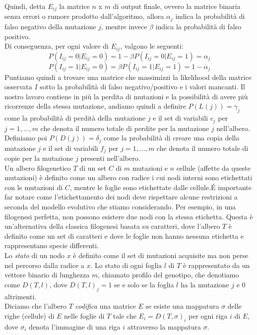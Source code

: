 \documentclass{report}
\begin{document}
  Quindi, detta $E_{ij}$ la matrice $n$ x $m$ di output finale, ovvero la matrice binaria senza errori o rumore prodotto dall'algoritmo, allora ${\alpha}_{j}$ indica la probabilità di falso negativo della mutazione $j$, mentre invece $\beta$ indica la probabilità di falso positivo.\\
  Di conseguenza, per ogni valore di ${E}_{ij}$, valgono le seguenti:
  \[
    P(I_{ij} = 0|{E}_{ij} = 0) = 1 - \beta P(I_{ij} = 0|E_{ij} = 1) = \alpha_{j}
  \]
  \[
    P(I_{ij} = 1|E_{ij} = 0) = \beta P(I_{ij} = 1|E_{ij} = 1) = 1 - \alpha_{j}
  \]
  Puntiamo quindi a trovare una matrice che massimizzi la likelihood della matrice osservata $I$ sotto la probabilità di falso negativo/positivo e i valori mancanti.
  Il nostro lavoro contiene in più la perdita di mutazioni e la possibilità di avere più ricorrenze della stessa mutazione, andiamo quindi a definire $P(L(j))={\gamma}_{j}$ come la probabilità di perdità della mutazione $j$ e il set di variabili ${c}_{j}$ per $j=1,...,m$ che denota il numero totale di perdite per la mutazione $j$ nell'albero.
  Definiamo poi $P(D(j))={\delta}_{j}$ come la probabilità di creare una copia della mutazione $j$ e il set di variabili ${f}_{j}$ per $j=1,...,m$ che denota il numero totale di copie per la mutazione $j$ presenti nell'albero.\\
  Un albero filogenetico $T$ di un set $C$ di $m$ mutazioni e $n$ cellule (affette da queste mutazioni) è definito come un albero con radice i cui nodi interni sono etichettati con le mutazioni di $C$, mentre le foglie sono etichettate dalle cellule.\;\'E importante far notare come l'etichettamento dei nodi deve rispettare alcune restrizioni a seconda del modello evolutivo che stiamo considerando. Per esempio, in una filogenesi perfetta, non possono esistere due nodi con la stessa etichetta.
  Questa è un'alternativa della classica filogenesi basata su caratteri, dove l'albero $T$ è definito come un set di caratteri e dove le foglie non hanno nessuna etichetta e rappresentano specie differenti.\\
  Lo \emph{stato} di un nodo $x$ è definito come il set di mutazioni acquisite ma non perse nel percorso dalla radice a $x$. Lo stato di ogni foglia $l$ di $T$ è rappresentato da un vettore binario di lunghezza $m$, chiamato profilo del genotipo, che denotiamo come $D(T, l)$, dove $D{(T, l)}_{j}=1$ se e solo se la foglia $l$ ha la mutazione $j$ e 0 altrimenti.\\
  Diciamo che l'albero $T$ \emph{codifica} una matrice $E$ se esiste una mappatura $\sigma$ delle righe (cellule) di $E$ nelle foglie di $T$ tale che $E_{i}=D(T, \sigma)_{i}$ per ogni riga $i$ di $E$, dove ${\sigma}_{i}$ denota l'immagine di una riga $i$ attraverso la mappatura $\sigma$.
\end{document}
